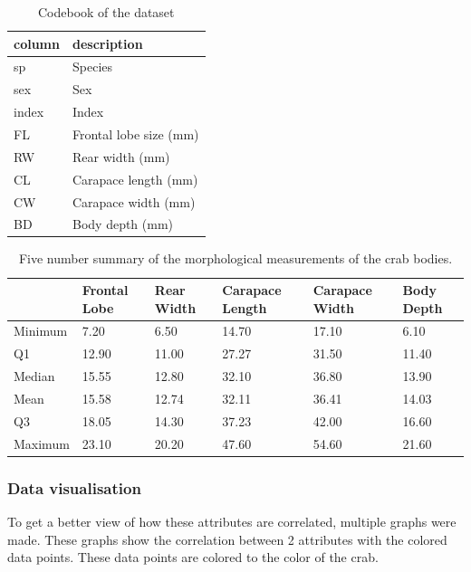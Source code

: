 \documentclass[
]{article}
\begin{document}
\begin{table}[!h]

\caption{\label{tab:read_data}Codebook of the dataset}
\centering
\fontsize{10}{12}\selectfont
\begin{tabular}[t]{l|l}
\hline
column & description\\
\hline
sp & Species\\
\hline
sex & Sex\\
\hline
index & Index\\
\hline
FL & Frontal lobe size (mm)\\
\hline
RW & Rear width (mm)\\
\hline
CL & Carapace length (mm)\\
\hline
CW & Carapace width (mm)\\
\hline
BD & Body depth (mm)\\
\hline
\end{tabular}
\end{table}

\begin{table}[!h]

\caption{\label{tab:summary}Five number summary of the morphological measurements of the crab bodies.}
\centering
\begin{tabular}[t]{l|l|l|l|l|l}
\hline
  & Frontal Lobe & Rear Width & Carapace Length & Carapace Width & Body Depth\\
\hline
Minimum & 7.20 & 6.50 & 14.70 & 17.10 & 6.10\\
\hline
Q1 & 12.90 & 11.00 & 27.27 & 31.50 & 11.40\\
\hline
Median & 15.55 & 12.80 & 32.10 & 36.80 & 13.90\\
\hline
Mean & 15.58 & 12.74 & 32.11 & 36.41 & 14.03\\
\hline
Q3 & 18.05 & 14.30 & 37.23 & 42.00 & 16.60\\
\hline
Maximum & 23.10 & 20.20 & 47.60 & 54.60 & 21.60\\
\hline
\end{tabular}
\end{table}

\hypertarget{data-visualisation}{%
\subsubsection{Data visualisation}\label{data-visualisation}}

To get a better view of how these attributes are correlated, multiple
graphs were made. These graphs show the correlation between 2 attributes
with the colored data points. These data points are colored to the color
of the crab.
\end{document}
